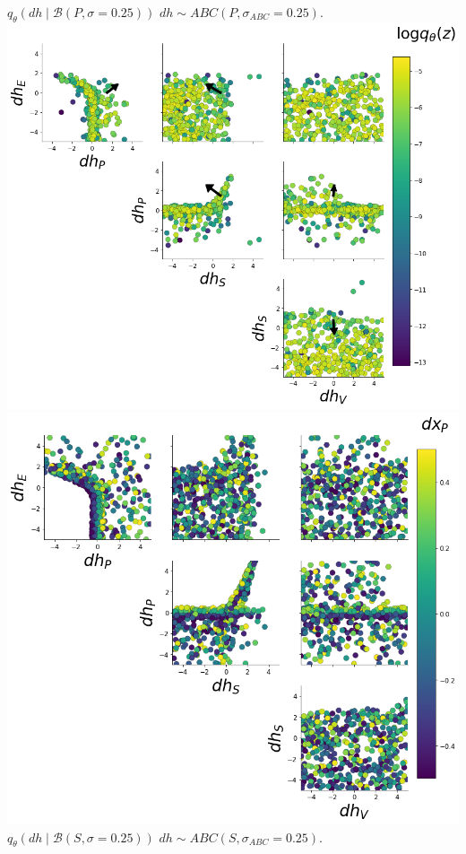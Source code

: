 \documentclass[11pt]{article}
\begin{document}
\begin{center}
\clearpage
$q_\theta(dh \mid \mathcal{B}(P,\sigma=0.25))$ \hspace{1.2in} $dh \sim ABC(P,\sigma_{ABC}=0.25)$. \\
\includegraphics[scale=0.25]{figs/V1_drdh_EPI_P.png} 
\includegraphics[scale=0.25]{figs/V1_drdh_ABC_P.png} \\
$q_\theta(dh \mid \mathcal{B}(S,\sigma=0.25))$ \hspace{1.2in} $dh \sim ABC(S,\sigma_{ABC}=0.25)$. \\

\end{center}
\end{document}
